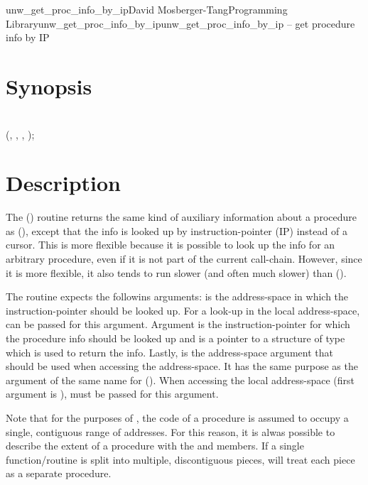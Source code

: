 \documentclass{article}
\begin{document}
\begin{Name}{3}{unw\_get\_proc\_info\_by\_ip}{David Mosberger-Tang}{Programming Library}{unw\_get\_proc\_info\_by\_ip}unw\_get\_proc\_info\_by\_ip -- get procedure info by IP
\end{Name}

\section{Synopsis}

\\

 (, , , );\\

\section{Description}

The () routine returns the same
kind of auxiliary information about a procedure as
(), except that the info is looked up by
instruction-pointer (IP) instead of a cursor.  This is more flexible
because it is possible to look up the info for an arbitrary procedure,
even if it is not part of the current call-chain.  However, since it
is more flexible, it also tends to run slower (and often much slower)
than ().

The routine expects the followins arguments:  is the
address-space in which the instruction-pointer should be looked up.
For a look-up in the local address-space,
 can be passed for this argument.
Argument  is the instruction-pointer for which the procedure
info should be looked up and  is a pointer to a structure of
type  which is used to return the info.
Lastly,  is the address-space argument that should be used
when accessing the address-space.  It has the same purpose as the
argument of the same name for ().  When
accessing the local address-space (first argument is
),  must be passed for this
argument.

Note that for the purposes of , the code of a
procedure is assumed to occupy a single, contiguous range of
addresses.  For this reason, it is alwas possible to describe the
extent of a procedure with the  and 
members.  If a single function/routine is split into multiple,
discontiguous pieces,  will treat each piece as a
separate procedure.
\end{document}
